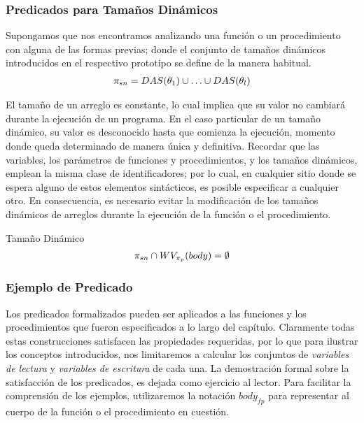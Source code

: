 \subsubsection{Predicados para Tamaños Dinámicos}

Supongamos que nos encontramos analizando una función o un procedimiento con alguna de las formas previas; donde el conjunto de tamaños dinámicos introducidos en el respectivo prototipo se define de la manera habitual.
\begin{gather*}
\pi_{sn} = DAS(\theta_1) \cup \ldots \cup DAS(\theta_l)
\end{gather*}

El tamaño de un arreglo es constante, lo cual implica que su valor no cambiará durante la ejecución de un programa.
En el caso particular de un tamaño dinámico, su valor es desconocido hasta que comienza la ejecución, momento donde queda determinado de manera única y definitiva.
Recordar que las variables, los parámetros de funciones y procedimientos, y los tamaños dinámicos, emplean la misma clase de identificadores; por lo cual, en cualquier sitio donde se espera alguno de estos elementos sintácticos, es posible especificar a cualquier otro.
En consecuencia, es necesario evitar la modificación de los tamaños dinámicos de arreglos durante la ejecución de la función o el procedimiento.

\begin{Predicado}
\label{PTDinamico}
Tamaño Dinámico
\begin{gather*}
\pi_{sn} \cap WV_{\pi_{p}}(body) = \emptyset
\end{gather*}
\end{Predicado}

\subsubsection{Ejemplo de Predicado}

Los predicados formalizados pueden ser aplicados a las funciones y los procedimientos que fueron especificados a lo largo del capítulo.
Claramente todas estas construcciones satisfacen las propiedades requeridas, por lo que para ilustrar los conceptos introducidos, nos limitaremos a calcular los conjuntos de \textit{variables de lectura} y \textit{variables de escritura} de cada una.
La demostración formal sobre la satisfacción de los predicados, es dejada como ejercicio al lector.
Para facilitar la comprensión de los ejemplos, utilizaremos la notación $body_{fp}$ para representar al cuerpo de la función o el procedimiento en cuestión.

